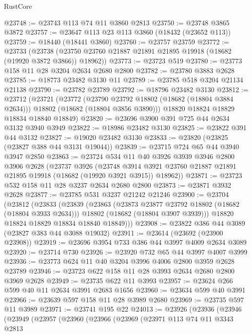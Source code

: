 \begin{lexlean}{RustCore}
\begin{coremodule}
@23748 := @23743 @113 @74 @11 @3860 @2813
@23750 := @23748 @3865 @3872
@23757 := @23647 @113 @23 @113 @3860 (@18432 (@23652 @113))
@23759 := @18440 (@18441 @3860)
@23760 := @23757 @23759
@23772 := @23733
    (@23738 (@23750 @23760 @21887 @21891 @21895 @19918 (@18682 (@19920 @3872 @3866)) @18962))
@23773 := @23723 @519
@23780 := @23773 @158 @11 @28 @3204 @2634 @2680 @2800
@23782 := @23780 @3883 @2628
@23785 := @18773 @23482 @3130 @11
@23789 := @23785 @518 @3204 @21134 @21138
@23790 := @23782 @23789
@23792 := @18796 @23482 @3130
@23812 := @23712
    (@23721
      (@23772
        (@23790 @23792 @18802 (@18682 (@18804 @3884 @2634)))
        @18802
        (@18682 (@18804 @3856 @3890)))
      @18820
      @18824
      @18829
      @18834
      @18840
      @18849)
@23820 := @23696 @3900 @391 @725 @44 @2634 @3132 @3940 @3949
@23822 := @18986 @23482 @3130
@23825 := @23822 @391 @44 @3132
@23827 := @19020 @23482 @3130
@23833 := @23820 (@23825 (@23827 @388 @44 @3131 @19044))
@23839 := @23715 @724 @65 @44 @3940 @3947 @2850
@23863 := @23724
    @534
    @11
    @40
    @3926
    @3939
    @3946
    @2800
    @3906
    @2628
    (@23737
      @3926
      (@23748 @3914 @3921 @23760 @21887 @21891 @21895 @19918 (@18682 (@19920 @3921 @3915)) @18962))
@23871 := @23723 @532 @158 @11 @28 @3237 @2634 @2680 @2800
@23873 := @23871 @3932 @2628
@23877 := @23785 @531 @3237 @21242 @21246
@23900 := @23704
    (@23812
      (@23833
        (@23839
          (@23863
            (@23873 @23877 @23792 @18802 (@18682 (@18804 @3933 @2634)))
            @18802
            (@18682 (@18804 @3907 @3939)))
          @18820
          @18824
          @18829
          @18834
          @18840
          @18849)))
@23908 := @23822 @386 @44 @3089 (@23827 @383 @44 @3088 @19032)
@23911 := @23614 (@23692 (@23900 @23908))
@23919 := @23696 @3954 @733 @386 @44 @3997 @4009 @2634 @3089
@23920 := @23714 @730
@23926 := @23920 @732 @65 @44 @3997 @4007 @3999
@23936 := @23773 @624 @11 @40 @3204 @3996 @4006 @2800 @3959 @2628 @23789
@23946 := @23723 @622 @158 @11 @28 @3993 @2634 @2680 @2800 @3969 @2628
@23949 := @23735 @622 @11 @3993
@23957 := @23624 @266 @599 @40 @11 @2634 @3991 @2683 @1656
@23960 := @23634 @599 @40 @3991
@23966 := @23639 @597 @158 @11 @28 @3989 @2680
@23969 := @23735 @597 @11 @3989
@23971 := @23741 @195 @22
@24013 := @23926
    (@23936
      (@23946
        (@23949
          (@23957
            (@23960
              (@23966
                (@23969
                  (@23971
                    @113
                    @74
                    @11
                    @3343
                    @2813

\end{coremodule}
\end{lexlean}
